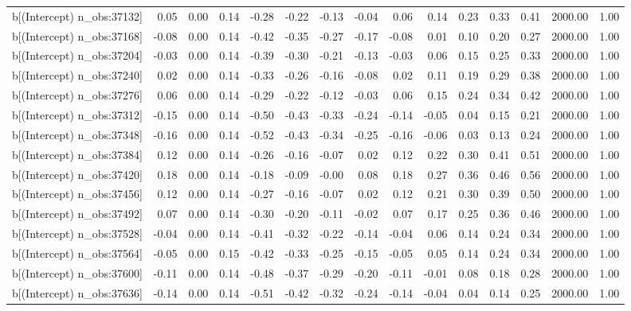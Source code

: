 \begin{table}[ht]
\begin{tabular}{rrrrrrrrrrrrrrr}
  b[(Intercept) n\_obs:37132] & 0.05 & 0.00 & 0.14 & -0.28 & -0.22 & -0.13 & -0.04 & 0.06 & 0.14 & 0.23 & 0.33 & 0.41 & 2000.00 & 1.00 \\ 
  b[(Intercept) n\_obs:37168] & -0.08 & 0.00 & 0.14 & -0.42 & -0.35 & -0.27 & -0.17 & -0.08 & 0.01 & 0.10 & 0.20 & 0.27 & 2000.00 & 1.00 \\ 
  b[(Intercept) n\_obs:37204] & -0.03 & 0.00 & 0.14 & -0.39 & -0.30 & -0.21 & -0.13 & -0.03 & 0.06 & 0.15 & 0.25 & 0.33 & 2000.00 & 1.00 \\ 
  b[(Intercept) n\_obs:37240] & 0.02 & 0.00 & 0.14 & -0.33 & -0.26 & -0.16 & -0.08 & 0.02 & 0.11 & 0.19 & 0.29 & 0.38 & 2000.00 & 1.00 \\ 
  b[(Intercept) n\_obs:37276] & 0.06 & 0.00 & 0.14 & -0.29 & -0.22 & -0.12 & -0.03 & 0.06 & 0.15 & 0.24 & 0.34 & 0.42 & 2000.00 & 1.00 \\ 
  b[(Intercept) n\_obs:37312] & -0.15 & 0.00 & 0.14 & -0.50 & -0.43 & -0.33 & -0.24 & -0.14 & -0.05 & 0.04 & 0.15 & 0.21 & 2000.00 & 1.00 \\ 
  b[(Intercept) n\_obs:37348] & -0.16 & 0.00 & 0.14 & -0.52 & -0.43 & -0.34 & -0.25 & -0.16 & -0.06 & 0.03 & 0.13 & 0.24 & 2000.00 & 1.00 \\ 
  b[(Intercept) n\_obs:37384] & 0.12 & 0.00 & 0.14 & -0.26 & -0.16 & -0.07 & 0.02 & 0.12 & 0.22 & 0.30 & 0.41 & 0.51 & 2000.00 & 1.00 \\ 
  b[(Intercept) n\_obs:37420] & 0.18 & 0.00 & 0.14 & -0.18 & -0.09 & -0.00 & 0.08 & 0.18 & 0.27 & 0.36 & 0.46 & 0.56 & 2000.00 & 1.00 \\ 
  b[(Intercept) n\_obs:37456] & 0.12 & 0.00 & 0.14 & -0.27 & -0.16 & -0.07 & 0.02 & 0.12 & 0.21 & 0.30 & 0.39 & 0.50 & 2000.00 & 1.00 \\ 
  b[(Intercept) n\_obs:37492] & 0.07 & 0.00 & 0.14 & -0.30 & -0.20 & -0.11 & -0.02 & 0.07 & 0.17 & 0.25 & 0.36 & 0.46 & 2000.00 & 1.00 \\ 
  b[(Intercept) n\_obs:37528] & -0.04 & 0.00 & 0.14 & -0.41 & -0.32 & -0.22 & -0.14 & -0.04 & 0.06 & 0.14 & 0.24 & 0.34 & 2000.00 & 1.00 \\ 
  b[(Intercept) n\_obs:37564] & -0.05 & 0.00 & 0.15 & -0.42 & -0.33 & -0.25 & -0.15 & -0.05 & 0.05 & 0.14 & 0.24 & 0.34 & 2000.00 & 1.00 \\ 
  b[(Intercept) n\_obs:37600] & -0.11 & 0.00 & 0.14 & -0.48 & -0.37 & -0.29 & -0.20 & -0.11 & -0.01 & 0.08 & 0.18 & 0.28 & 2000.00 & 1.00 \\ 
  b[(Intercept) n\_obs:37636] & -0.14 & 0.00 & 0.14 & -0.51 & -0.42 & -0.32 & -0.24 & -0.14 & -0.04 & 0.04 & 0.14 & 0.25 & 2000.00 & 1.00 \\ 

\end{tabular}
\end{table}
